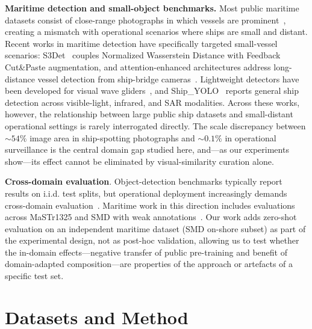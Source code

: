 \documentclass[10pt,conference]{IEEEtran}
\providecommand{\DIFadd}[1]{{\protect\color{blue}\uwave{#1}}} %
\providecommand{\DIFdel}[1]{{\protect\color{red}\sout{#1}}}                      %
\providecommand{\DIFaddbegin}{} %
\providecommand{\DIFaddend}{} %
\providecommand{\DIFdelbegin}{} %
\providecommand{\DIFdelend}{} %
\newcommand{\DIFscaledelfig}{0.5}
\newlength{\DIFdelgraphicswidth} %
\newlength{\DIFdelgraphicsheight} %
\newcommand{\DIFaddincludegraphics}[2][]{{\color{blue}\fbox{\DIFOincludegraphics[#1]{#2}}}} %
\newcommand{\DIFdelincludegraphics}[2][]{%
\sbox{\DIFdelgraphicsbox}{\DIFOincludegraphics[#1]{#2}}%
\settoboxwidth{\DIFdelgraphicswidth}{\DIFdelgraphicsbox} %
\settoboxtotalheight{\DIFdelgraphicsheight}{\DIFdelgraphicsbox} %
\scalebox{\DIFscaledelfig}{%
\parbox[b]{\DIFdelgraphicswidth}{\usebox{\DIFdelgraphicsbox}\\[-\baselineskip] \rule{\DIFdelgraphicswidth}{0em}}\llap{\resizebox{\DIFdelgraphicswidth}{\DIFdelgraphicsheight}{%
\setlength{\unitlength}{\DIFdelgraphicswidth}%
\begin{picture}(1,1)%
\thicklines\linethickness{2pt} %
{\color[rgb]{1,0,0}\put(0,0){\framebox(1,1){}}}%
{\color[rgb]{1,0,0}\put(0,0){\line( 1,1){1}}}%
{\color[rgb]{1,0,0}\put(0,1){\line(1,-1){1}}}%
\end{picture}%
}\hspace*{3pt}}} %
} %
\DeclareRobustCommand{\DIFaddbegin}{\DIFOaddbegin \let\includegraphics\DIFaddincludegraphics} %
\DeclareRobustCommand{\DIFaddend}{\DIFOaddend \let\includegraphics\DIFOincludegraphics} %
\DeclareRobustCommand{\DIFdelbegin}{\DIFOdelbegin \let\includegraphics\DIFdelincludegraphics} %
\DeclareRobustCommand{\DIFdelend}{\DIFOaddend \let\includegraphics\DIFOincludegraphics} %
\begin{document}
\textbf{Maritime detection and small-object benchmarks.} Most public maritime datasets consist of close-range photographs in which vessels are prominent~\cite{shao2018seaships,teixeira2025inatechships}, creating a mismatch with operational scenarios where ships are small and distant. Recent works in maritime detection have specifically targeted small-vessel scenarios: S3Det~\cite{li2024s3det} couples Normalized Wasserstein Distance with Feedback Cut\&Paste augmentation, and attention-enhanced architectures address long-distance vessel detection from ship-bridge cameras~\cite{zhang2025longdistance}. Lightweight detectors have been developed for visual wave gliders~\cite{ding2025waveglider}, and Ship\_YOLO~\cite{li2025shipyolo} reports general ship detection across visible-light, infrared, and SAR modalities.
 Across these works, however, the relationship between large public ship datasets and small-distant operational settings is rarely interrogated directly. The scale discrepancy between \DIFdelbegin \DIFdel{$\sim 54\%$ }\DIFdelend \DIFaddbegin \DIFadd{$\sim 39\%$ median }\DIFaddend image area in ship-spotting photographs and $\sim 0.1\%$ in operational surveillance is the central domain gap studied here, and—as our experiments show—its effect cannot be eliminated by visual-similarity curation alone.

 \textbf{Cross-domain evaluation}. Object-detection benchmarks typically report results on i.i.d. test splits, but operational deployment increasingly demands cross-domain evaluation~\cite{oza2023uda}. Maritime work in this direction includes evaluations across MaSTr1325 and SMD with weak annotations~\cite{bovcon2022slr}. Our work adds zero-shot evaluation on an independent maritime dataset (SMD on-shore subset) as part of the experimental design, not as post-hoc validation, allowing us to test whether the in-domain effects—negative transfer of public pre-training and benefit of domain-adapted composition—are properties of the approach or artefacts of a specific test set.

\section{Datasets and Method}
\end{document}
